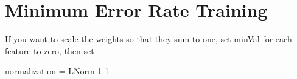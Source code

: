 \chapter{Minimum Error Rate Training}

If you want to scale the weights so that they sum to one, set minVal for each feature to zero, then set 

normalization = LNorm 1 1

